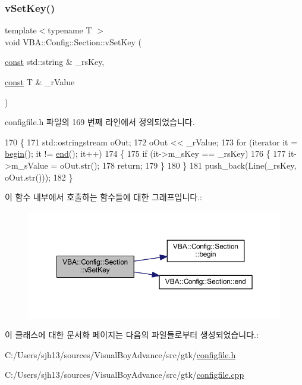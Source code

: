 \subsubsection{\texorpdfstring{v\+Set\+Key()}{vSetKey()}\hspace{0.1cm}{\footnotesize\ttfamily [2/2]}}
{\footnotesize\ttfamily template$<$typename T $>$ \\
void V\+B\+A\+::\+Config\+::\+Section\+::v\+Set\+Key (\begin{DoxyParamCaption}\item[{\mbox{\hyperlink{getopt1_8c_a2c212835823e3c54a8ab6d95c652660e}{const}} std\+::string \&}]{\+\_\+rs\+Key,  }\item[{\mbox{\hyperlink{getopt1_8c_a2c212835823e3c54a8ab6d95c652660e}{const}} T \&}]{\+\_\+r\+Value }\end{DoxyParamCaption})}



configfile.\+h 파일의 169 번째 라인에서 정의되었습니다.


\begin{DoxyCode}
170 \{
171   std::ostringstream oOut;
172   oOut << \_rValue;
173   \textcolor{keywordflow}{for} (iterator it = \mbox{\hyperlink{class_v_b_a_1_1_config_1_1_section_ac345183b43a45fd3eeaa646eac631390}{begin}}(); it != \mbox{\hyperlink{class_v_b_a_1_1_config_1_1_section_a15ff15ecb9f7f3aa0bb1c218d47f8829}{end}}(); it++)
174   \{
175     \textcolor{keywordflow}{if} (it->m\_sKey == \_rsKey)
176     \{
177       it->m\_sValue = oOut.str();
178       \textcolor{keywordflow}{return};
179     \}
180   \}
181   push\_back(Line(\_rsKey, oOut.str()));
182 \}
\end{DoxyCode}
이 함수 내부에서 호출하는 함수들에 대한 그래프입니다.\+:
\nopagebreak
\begin{figure}[H]
\begin{center}
\leavevmode
\includegraphics[width=350pt]{class_v_b_a_1_1_config_1_1_section_afd12017e2b18dd1e1be08dde721a37d0_cgraph}
\end{center}
\end{figure}


이 클래스에 대한 문서화 페이지는 다음의 파일들로부터 생성되었습니다.\+:\begin{DoxyCompactItemize}
\item 
C\+:/\+Users/sjh13/sources/\+Visual\+Boy\+Advance/src/gtk/\mbox{\hyperlink{configfile_8h}{configfile.\+h}}\item 
C\+:/\+Users/sjh13/sources/\+Visual\+Boy\+Advance/src/gtk/\mbox{\hyperlink{configfile_8cpp}{configfile.\+cpp}}\end{DoxyCompactItemize}
